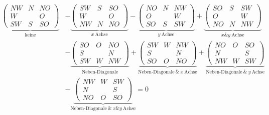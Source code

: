 \begin{solution}
\begin{align*}
  \underbrace
  {
    \begin{pmatrix}
      NW & N & NO \\
      W  &   & O  \\
      SW & S & SO
    \end{pmatrix}
  }_{
    \text{keine}
  }
  & -
  \underbrace
  {
    \begin{pmatrix}
      SW & S & SO \\
      W  &   & O  \\
      NW & N & NO
    \end{pmatrix}
  }_{
    x ~\text{Achse}
  }
  -
  \underbrace
  {
    \begin{pmatrix}
      NO & N & NW \\
      O  &   & W  \\
      SO & S & SW
    \end{pmatrix}
  }_{
    y ~\text{Achse}
  }
  +
  \underbrace
  {
    \begin{pmatrix}
      SO & S & SW \\
      O  &   & W  \\
      NO & N & NW
    \end{pmatrix}
  }_{
    x \& y ~\text{Achse}
  } \\
  & -
  \underbrace
  {
    \begin{pmatrix}
      SO & O & NO \\
      S  &   & N  \\
      SW & W & NW
    \end{pmatrix}
  }_{
    \text{Neben-Diagonale}
  }
  +
  \underbrace
  {
    \begin{pmatrix}
      SW & W & NW \\
      S  &   & N  \\
      SO & O & NO
    \end{pmatrix}
  }_{
    \text{Neben-Diagonale}~
    \&~
    x ~\text{Achse}
  }
  +
  \underbrace
  {
    \begin{pmatrix}
      NO & O & SO \\
      N  &   & S  \\
      NW & W & SW
    \end{pmatrix}
  }_{
    \text{Neben-Diagonale}~
    \&~
    y ~\text{Achse}
  } \\
  & -
  \underbrace
  {
    \begin{pmatrix}
      NW & W & SW \\
      N  &   & S  \\
      NO & O & SO
    \end{pmatrix}
  }_{
    \text{Neben-Diagonale}~
    \&~
    x \& y ~\text{Achse}
  }
  =
  0
\end{align*}


\end{solution}
